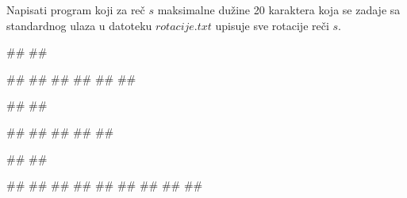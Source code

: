 \begin{Exercise}[label=p3_08] 
 Napisati program koji za reč $s$ maksimalne dužine 20 karaktera koja se zadaje sa standardnog ulaza u datoteku $rotacije.txt$ upisuje sve rotacije reči $s$. \\
\begin{minitest}
\begin{upotreba}{1}
#\naslovInt#
##

##
##
##
##
##
##
\end{upotreba}
\end{minitest}
\begin{minitest}
\begin{upotreba}{2}
#\naslovInt#
##

##
##
##
##
##
\end{upotreba}
\end{minitest}
\begin{minitest}
\begin{upotreba}{3}
#\naslovInt#
##

##
##
##
##
##
##
##
##
##
\end{upotreba}
\end{minitest}
\end{Exercise}
\begin{Answer}[ref=p3_08]
\end{Answer}

